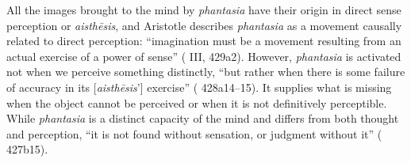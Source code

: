 \documentclass{article}
\begin{document}
All the images brought to the mind by \textit{phantasia} have their origin in direct sense perception or \textit{aisthēsis}, and Aristotle describes \textit{phantasia} as a movement causally related to direct perception: ``imagination must be a movement resulting from an actual exercise of a power of sense'' (\cite{aristotle2014soul} III, 429a2). However, \textit{phantasia} is activated not when we perceive something distinctly, ``but rather when there is some failure of accuracy in its [\textit{aisthēsis}'] exercise'' (\cite{aristotle2014soul} 428a14--15). It supplies what is missing when the object cannot be perceived or when it is not definitively perceptible. While \textit{phantasia} is a distinct capacity of the mind and differs from both thought and perception, ``it is not found without sensation, or judgment without it'' (\cite{aristotle2014soul} 427b15).
\end{document}
